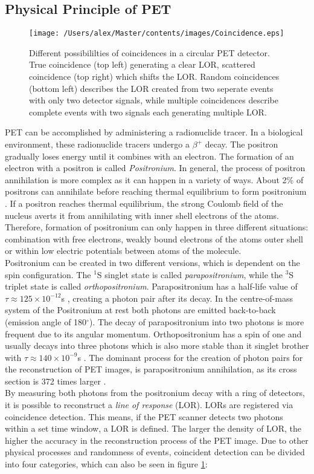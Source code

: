 \subsection{Physical Principle of PET}
\begin{figure}[htp]
\centering
\texttt{[image: /Users/alex/Master/contents/images/Coincidence.eps]}
\vspace{1cm}
\caption{Different possibililties of coincidences in a circular PET detector. True coincidence (top left) generating a clear LOR, scattered coincidence (top right) which shifts the LOR. Random coincidences (bottom left) describes the LOR created from two seperate events with only two detector signals, while multiple coincidences describe complete events with two signals each generating multiple LOR.}
\label{fig:coincidence}
\end{figure}
PET can be accomplished by administering a radionuclide tracer. In a biological environment, these radionuclide tracers undergo a $\beta^+$ decay. The positron gradually loses energy until it combines with an electron. The formation of an electron with a positron is called \textit{Positronium}. In general, the process of positron annihilation is more complex as it can happen in a variety of ways. About 2\% of positrons can annihilate before reaching thermal equilibrium to form positronium \cite{Heitler}. If a positron reaches thermal equilibrium, the strong Coulomb field of the nucleus averts it from annihilating with inner shell electrons of the atoms. Therefore, formation of positronium can only happen in three different situations: combination with free electrons, weakly bound electrons of the atoms outer shell or within low electric potentials between atoms of the molecule.\\Positronium can be created in two different versions, which is dependent on the spin configuration. The $^1$S singlet state is called \textit{parapositronium}, while the $^3$S triplet state is called \textit{orthopositronium}. Parapositronium has a half-life value of $\tau  \approx 125 \times 10^{-12}$s \cite{PDG}, creating a photon pair after its decay. In the centre-of-mass system of the Positronium at rest both photons are emitted back-to-back (emission angle of 180$^\circ$). The decay of parapositronium into two photons is more frequent due to its angular momentum. Orthopositronium has a spin of one and usually decays into three photons which is also more stable than it singlet brother with $\tau  \approx 140 \times 10^{-9}$s \cite{PDG}. The dominant process for the creation of photon pairs for the reconstruction of PET images, is parapositronium annihilation, as its cross section is 372 times larger \cite{Musiol}.\\By measuring both photons from the positronium decay with a ring of detectors, it is possible to reconstruct a \textit{line of response} (LOR). LORs are registered via coincidence detection. This means, if the PET scanner detects two photons within a set time window, a LOR is defined. The larger the density of LOR, the higher the accuracy in the reconstruction process of the PET image. Due to other physical processes and randomness of events, coincident detection can be divided into four categories, which can also be seen in figure \ref{fig:coincidence}:
